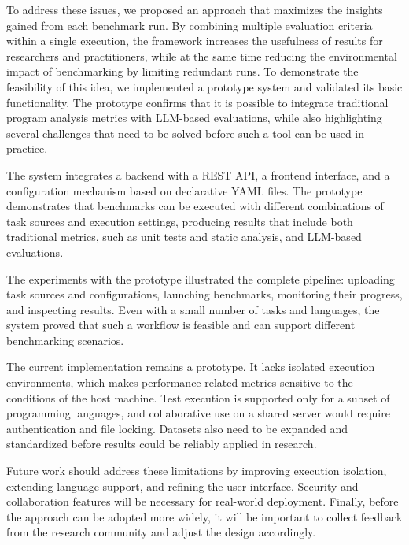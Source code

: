 To address these issues, we proposed an approach that maximizes the insights gained from each benchmark run.
By combining multiple evaluation criteria within a single execution, the framework increases the usefulness of results for researchers and practitioners, while at the same time reducing the environmental impact of benchmarking by limiting redundant runs.
To demonstrate the feasibility of this idea, we implemented a prototype system and validated its basic functionality.
The prototype confirms that it is possible to integrate traditional program analysis metrics with LLM-based evaluations, while also highlighting several challenges that need to be solved before such a tool can be used in practice.

The system integrates a backend with a REST API, a frontend interface, and a configuration mechanism based on declarative YAML files.
The prototype demonstrates that benchmarks can be executed with different combinations of task sources and execution settings, producing results that include both traditional metrics, such as unit tests and static analysis, and LLM-based evaluations.

The experiments with the prototype illustrated the complete pipeline: uploading task sources and configurations, launching benchmarks, monitoring their progress, and inspecting results.
Even with a small number of tasks and languages, the system proved that such a workflow is feasible and can support different benchmarking scenarios.

The current implementation remains a prototype.
It lacks isolated execution environments, which makes performance-related metrics sensitive to the conditions of the host machine.
Test execution is supported only for a subset of programming languages, and collaborative use on a shared server would require authentication and file locking.
Datasets also need to be expanded and standardized before results could be reliably applied in research.

Future work should address these limitations by improving execution isolation, extending language support, and refining the user interface.
Security and collaboration features will be necessary for real-world deployment.
Finally, before the approach can be adopted more widely, it will be important to collect feedback from the research community and adjust the design accordingly.
